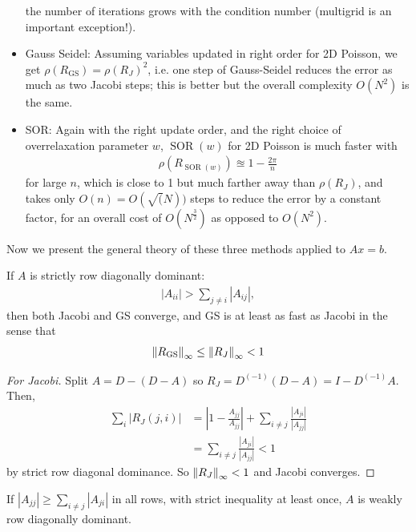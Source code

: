 \documentclass[11pt]{article}
\numberwithin{equation}{section}
\begin{document}
\begin{itemize}
    the number of iterations grows with the condition number (multigrid is an important exception!).
    \item Gauss Seidel: Assuming variables updated in right order for 2D Poisson, 
    we get $\rho(R_{\operatorname{GS}}) = \rho(R_J)^2$, i.e. one step of Gauss-Seidel reduces the error as much as two Jacobi steps; 
    this is better but the overall complexity $O(N^2)$ is the same.
    \item SOR: Again with the right update order, and the right choice of overrelaxation parameter $w$, $\operatorname{SOR}(w)$ for 2D Poisson is much faster with \begin{align*}
        \rho(R_{\operatorname{SOR}(w)}) \approxeq 1 - \frac{2\pi}{n}
    \end{align*}
    for large $n$, which is close to 1 but much farther away than $\rho(R_J)$, and takes only $O(n) = O(\sqrt(N))$ steps to reduce the error by a constant factor, 
    for an overall cost of $O(N^{\frac{3}{2}})$ as opposed to $O(N^2)$.
\end{itemize}

Now we present the general theory of these three methods applied to $Ax=b$.
\begin{theorem}
    If $A$ is strictly row diagonally dominant: \begin{align*}
        |A_{ii}| > \sum_{j \neq i} |A_{ij}|,       
    \end{align*}
    then both Jacobi and GS converge, and GS is at least as fast as Jacobi in the sense that \begin{align*}
        \left\| R_{\operatorname{GS}} \right\|_{\infty} \leq \left\| R_{J} \right\|_{\infty} < 1
    \end{align*}
    \begin{proof}[For Jacobi]
        Split $A = D - (D - A)$ so $R_J = D^(-1)(D-A) = I -D^(-1)A$. Then, \begin{align*}
            \sum_i |R_J(j,i)| &= \left|1-\frac{A_{j j}}{A_{jj}}\right| + \sum_{i\neq {j}} \frac{\left|A_{j i}\right|}{\left|A_{jj}\right|} \\
            &= \sum_{i\neq {j}} \frac{\left|A_{j i}\right|}{\left|A_{jj}\right|} < 1
        \end{align*}
        by strict row diagonal dominance. So $\left\| R_{J} \right\|_{\infty} < 1$ and Jacobi converges.
    \end{proof}
\end{theorem}

\begin{definition}
    If $\left|A_{j j}\right| \geq \sum_{i \neq j}\left|A_{j i}\right|$ in all rows, with strict inequality at least once, $A$ is weakly row diagonally dominant.
\end{definition}
\end{document}
